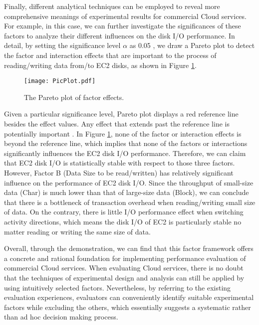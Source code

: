 \documentclass[10pt, conference, compsocconf]{IEEEtran}
\begin{document}
Finally, different analytical techniques can be employed to reveal more comprehensive meanings of experimental results \cite{Antony_2003} for commercial Cloud services. For example, in this case, we can further investigate the significances of these factors to analyze their different influences on the disk I/O performance. In detail, by setting the significance level $\alpha$ as 0.05 \cite{Jackson_2011}, we draw a Pareto plot to detect the factor and interaction effects that are important to the process of reading/writing data from/to EC2 disks, as shown in Figure \ref{fig>PicPlot}. 

\begin{figure}[!t]
\centering
\texttt{[image: PicPlot.pdf]}
\caption{The Pareto plot of factor effects.}
\label{fig>PicPlot}
\end{figure}

Given a particular significance level, Pareto plot displays a red reference line besides the effect values. Any effect that extends past the reference line is potentially important \cite{Antony_2003}. In Figure \ref{fig>PicPlot}, none of the factor or interaction effects is beyond the reference line, which implies that none of the factors or interactions significantly influences the EC2 disk I/O performance. Therefore, we can claim that EC2 disk I/O is statistically stable with respect to those three factors. However, Factor B (Data Size to be read/written) has relatively significant influence on the performance of EC2 disk I/O. Since the throughput of small-size data (Char) is much lower than that of large-size data (Block), we can conclude that there is a bottleneck of transaction overhead when reading/writing small size of data. On the contrary, there is little I/O performance effect when switching activity directions, which means the disk I/O of EC2 is particularly stable no matter reading or writing the same size of data.

Overall, through the demonstration, we can find that this factor framework offers a concrete and rational foundation for implementing performance evaluation of commercial Cloud services. When evaluating Cloud services, there is no doubt that the techniques of experimental design and analysis can still be applied by using intuitively selected factors. Nevertheless, by referring to the existing evaluation experiences, evaluators can conveniently identify suitable experimental factors while excluding the others, which essentially suggests a systematic rather than ad hoc decision making process.
\end{document}
